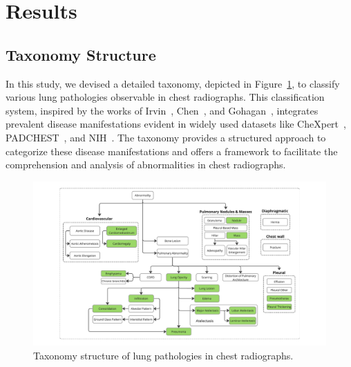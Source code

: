 \documentclass[review,1p,times,numbers]{elsarticle}
\begin{document}
\section{Results}\label{sec:taxonomy.results}

\subsection{Taxonomy Structure}
In this study, we devised a detailed taxonomy, depicted in Figure~\ref{fig:taxonomy.fig.1.taxonomy_structure}, to classify various lung pathologies observable in chest radiographs. This classification system, inspired by the works of Irvin~\cite{irvin_CheXpert_2019}, Chen~\cite{chen_Deep_2020}, and Gohagan~\cite{gohagan_Prostate_2000}, integrates prevalent disease manifestations evident in widely used datasets like CheXpert~\cite{irvin_CheXpert_2019}, PADCHEST~\cite{bustos_Padchest_2020}, and NIH~\cite{wang_ChestXRay8_2017}. The taxonomy provides a structured approach to categorize these disease manifestations and offers a framework to facilitate the comprehension and analysis of abnormalities in chest radiographs.
\begin{figure}[htbp]
    \centering
    \includegraphics[width=\textwidth]{figures/taxonomy_structure/taxonomy_structure.pdf}
    \caption[Taxonomy Structure of Lung Pathologies in Chest Radiographs]{Taxonomy structure of lung pathologies in chest radiographs.}\label{fig:taxonomy.fig.1.taxonomy_structure}
\end{figure}
\end{document}
